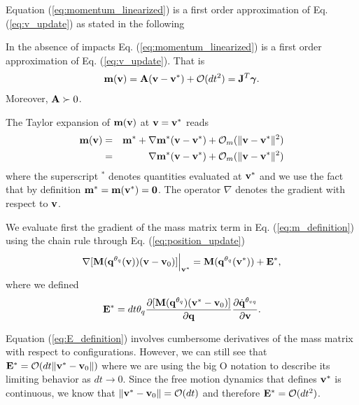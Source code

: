 Equation (\ref{eq:momentum_linearized}) is a first order approximation of Eq.
(\ref{eq:v_update}) as stated in the following
\begin{theorem}	
	In the absence of impacts Eq. (\ref{eq:momentum_linearized}) is a first
	order approximation of Eq. (\ref{eq:v_update}). That is
	\begin{eqnarray}
		{\mathbf{m}}({\mathbf{v}}) = {\mathbf{A}}({\mathbf{v}}-{\mathbf{v}}^*) + \mathcal{O}(dt^2) =
		{\mathbf{J}}^T{\mathbf{{\bm\gamma}}}.
	\end{eqnarray}
Moreover, ${\mathbf{A}} \succ 0$.
\end{theorem}

\begin{IEEEproof}
The Taylor expansion of ${\mathbf{m}}({\mathbf{v}})$ at ${\mathbf{v}}={\mathbf{v}}^*$ reads
\begin{eqnarray}
	\mf{m}(\mf{v}) &=& \mf{m}^* +
	\nabla\mf{m}^*(\mf{v}-\mf{v}^*) + \mathcal{O}_m(\Vert\mf{v}-\mf{v}^*\Vert^2)\nonumber\\
	&=&\nabla\mf{m}^*(\mf{v}-\mf{v}^*) + \mathcal{O}_m(\Vert\mf{v}-\mf{v}^*\Vert^2)
	\label{eq:m_taylor_expansion}
\end{eqnarray}
where the superscript $^*$ denotes quantities evaluated at ${\mathbf{v}}^*$ and we use
the fact that by definition ${\mathbf{m}}^*={\mathbf{m}}({\mathbf{v}}^*)={\mathbf{0}}$. The operator
$\nabla$ denotes the gradient with respect to ${\mathbf{v}}$.

We evaluate first the gradient of the mass matrix term in Eq.
(\ref{eq:m_definition}) using the chain rule through Eq.
(\ref{eq:position_update})
\begin{eqnarray}
	\nabla[{\mathbf{M}}({\mathbf{q}}^{\theta_{q}}({\mathbf{v}}))({\mathbf{v}}-{\mathbf{v}}_0)]\Bigr|_{{\mathbf{v}}^*}
	= {\mathbf{M}}({\mathbf{q}}^{\theta_{q}}({\mathbf{v}}^*)) + {\mathbf{E}}^*,
\end{eqnarray}
where we defined
\begin{eqnarray}
	\mf{E}^* =
	dt\theta_q\frac{\partial[\mf{M}(\mf{q}^{\theta_{q}})(\mf{v}^*-\mf{v}_0)]}{\partial\mf{q}}\frac{\partial\dot{\mf{q}}^{\theta_{vq}}}{\partial\mf{v}}.
	\label{eq:E_definition}
\end{eqnarray}

Equation (\ref{eq:E_definition}) involves cumbersome derivatives of the mass matrix with respect to configurations. However, we can still see that ${\mathbf{E}}^*=\mathcal{O}(dt\Vert{\mathbf{v}}^*-{\mathbf{v}}_0\Vert)$ where we are using the big O notation to describe its limiting behavior as $dt\rightarrow 0$. Since the free motion dynamics that defines ${\mathbf{v}}^*$ is continuous, we know that $\Vert{\mathbf{v}}^*-{\mathbf{v}}_0\Vert = \mathcal{O}(dt)$ and therefore ${\mathbf{E}}^* = \mathcal{O}(dt^2)$.


\end{IEEEproof}
